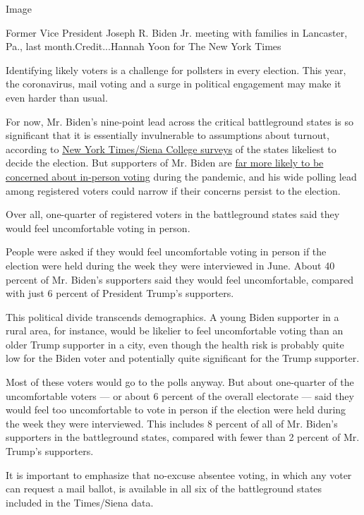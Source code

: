 Image

Former Vice President Joseph R. Biden Jr. meeting with families in
Lancaster, Pa., last month.Credit...Hannah Yoon for The New York Times

Identifying likely voters is a challenge for pollsters in every
election. This year, the coronavirus, mail voting and a surge in
political engagement may make it even harder than usual.

For now, Mr. Biden's nine-point lead across the critical battleground
states is so significant that it is essentially invulnerable to
assumptions about turnout, according to
\href{https://www.nytimes3xbfgragh.onion/2020/06/25/upshot/poll-2020-biden-battlegrounds.html}{New
York Times/Siena College surveys} of the states likeliest to decide the
election. But supporters of Mr. Biden are
\href{https://www.nytimes3xbfgragh.onion/2020/07/03/upshot/biden-supporters-are-more-worried-about-the-health-risks-of-voting.html}{far
more likely to be concerned about in-person voting} during the pandemic,
and his wide polling lead among registered voters could narrow if their
concerns persist to the election.

Over all, one-quarter of registered voters in the battleground states
said they would feel uncomfortable voting in person.

People were asked if they would feel uncomfortable voting in person if
the election were held during the week they were interviewed in June.
About 40 percent of Mr. Biden's supporters said they would feel
uncomfortable, compared with just 6 percent of President Trump's
supporters.

This political divide transcends demographics. A young Biden supporter
in a rural area, for instance, would be likelier to feel uncomfortable
voting than an older Trump supporter in a city, even though the health
risk is probably quite low for the Biden voter and potentially quite
significant for the Trump supporter.

Most of these voters would go to the polls anyway. But about one-quarter
of the uncomfortable voters --- or about 6 percent of the overall
electorate --- said they would feel too uncomfortable to vote in person
if the election were held during the week they were interviewed. This
includes 8 percent of all of Mr. Biden's supporters in the battleground
states, compared with fewer than 2 percent of Mr. Trump's supporters.

It is important to emphasize that no-excuse absentee voting, in which
any voter can request a mail ballot, is available in all six of the
battleground states included in the Times/Siena data.

